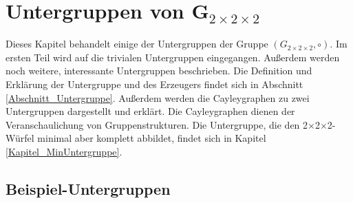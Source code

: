 \documentclass[12pt,a4paper, usenames, dvipsnames]{article}
\theoremstyle{mystyle}
\theoremstyle{definition}
\newcommand{\Gtwo}{\ensuremath{G_{2\times 2\times 2}}}
\newcommand{\Ttwo}{2$\times$2$\times$2-}
\begin{document}
\section{Untergruppen von G$_{2\times 2\times 2}$}

\label{Kapitel_Untergruppen}

Dieses Kapitel behandelt einige der Untergruppen der Gruppe $(\Gtwo, \circ)$. Im ersten Teil wird auf die trivialen Untergruppen eingegangen. Außerdem werden noch weitere, interessante Untergruppen beschrieben.
Die Definition und Erklärung der Untergruppe und des Erzeugers findet sich in Abschnitt \ref{Abschnitt_Untergruppe}.
Außerdem werden die Cayleygraphen zu zwei Untergruppen dargestellt und erklärt. Die Cayleygraphen dienen der Veranschaulichung von Gruppenstrukturen. Die Untergruppe, die den \Ttwo Würfel minimal aber komplett abbildet, findet sich in Kapitel \ref{Kapitel_MinUntergruppe}.

%
%
%
%
%
%
%
%
%
%
%
%
%
%
%
%
%
%
%
%
\subsection{Beispiel-Untergruppen}

\label{Abschnitt_UntergruppenBeispiele}
\end{document}
